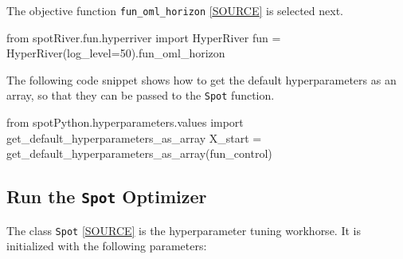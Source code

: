 \documentclass[
  letterpaper,
  DIV=11,
  numbers=noendperiod]{scrreprt}
\newenvironment{Shaded}{\begin{snugshade}}{\end{snugshade}}
\newcommand{\DecValTok}[1]{\textcolor[rgb]{0.68,0.00,0.00}{#1}}
\newcommand{\ImportTok}[1]{\textcolor[rgb]{0.00,0.46,0.62}{#1}}
\newcommand{\NormalTok}[1]{\textcolor[rgb]{0.00,0.23,0.31}{#1}}
\newcommand{\OperatorTok}[1]{\textcolor[rgb]{0.37,0.37,0.37}{#1}}
\begin{document}
The objective function \texttt{fun\_oml\_horizon}
\href{https://github.com/sequential-parameter-optimization/spotRiver/blob/main/src/spotRiver/fun/hyperriver.py}{{[}SOURCE{]}}
is selected next.

\begin{Shaded}
\begin{Highlighting}[]
\ImportTok{from}\NormalTok{ spotRiver.fun.hyperriver }\ImportTok{import}\NormalTok{ HyperRiver}
\NormalTok{fun }\OperatorTok{=}\NormalTok{ HyperRiver(log\_level}\OperatorTok{=}\DecValTok{50}\NormalTok{).fun\_oml\_horizon}
\end{Highlighting}
\end{Shaded}

The following code snippet shows how to get the default hyperparameters
as an array, so that they can be passed to the \texttt{Spot} function.

\begin{Shaded}
\begin{Highlighting}[]
\ImportTok{from}\NormalTok{ spotPython.hyperparameters.values }\ImportTok{import}\NormalTok{ get\_default\_hyperparameters\_as\_array}
\NormalTok{X\_start }\OperatorTok{=}\NormalTok{ get\_default\_hyperparameters\_as\_array(fun\_control)}
\end{Highlighting}
\end{Shaded}

\hypertarget{run-the-spot-optimizer-7}{%
\subsection{\texorpdfstring{Run the \texttt{Spot}
Optimizer}{Run the Spot Optimizer}}\label{run-the-spot-optimizer-7}}

The class \texttt{Spot}
\href{https://github.com/sequential-parameter-optimization/spotPython/blob/main/src/spotPython/spot/spot.py}{{[}SOURCE{]}}
is the hyperparameter tuning workhorse. It is initialized with the
following parameters:
\end{document}
